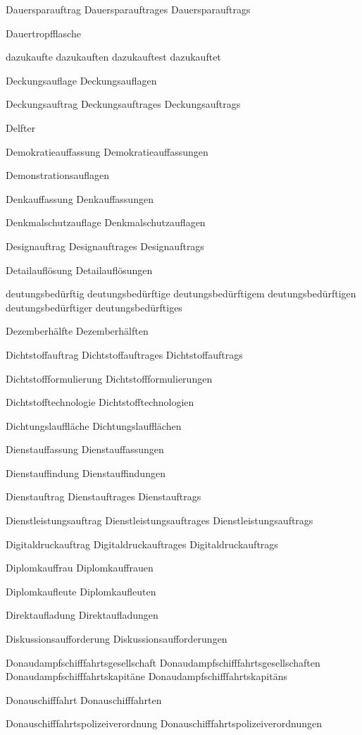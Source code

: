 Dauersparauftrag
Dauersparauftrages
Dauersparauftrags

Dauertropfflasche

dazukaufte
dazukauften
dazukauftest
dazukauftet

Deckungsauflage
Deckungsauflagen

Deckungsauftrag
Deckungsauftrages
Deckungsauftrags

Delfter

Demokratieauffassung
Demokratieauffassungen

Demonstrationsauflagen

Denkauffassung
Denkauffassungen

Denkmalschutzauflage
Denkmalschutzauflagen

Designauftrag
Designauftrages
Designauftrags

Detailauflösung
Detailauflösungen

deutungsbedürftig
deutungsbedürftige
deutungsbedürftigem
deutungsbedürftigen
deutungsbedürftiger
deutungsbedürftiges

Dezemberhälfte
Dezemberhälften

Dichtstoffauftrag
Dichtstoffauftrages
Dichtstoffauftrags

Dichtstoffformulierung
Dichtstoffformulierungen

Dichtstofftechnologie
Dichtstofftechnologien

Dichtungslauffläche
Dichtungslaufflächen

Dienstauffassung
Dienstauffassungen

Dienstauffindung
Dienstauffindungen

Dienstauftrag
Dienstauftrages
Dienstauftrags

Dienstleistungsauftrag
Dienstleistungsauftrages
Dienstleistungsauftrags

Digitaldruckauftrag
Digitaldruckauftrages
Digitaldruckauftrags

Diplomkauffrau
Diplomkauffrauen

Diplomkaufleute
Diplomkaufleuten

Direktaufladung
Direktaufladungen

Diskussionsaufforderung
Diskussionsaufforderungen

Donaudampfschifffahrtsgesellschaft
Donaudampfschifffahrtsgesellschaften
Donaudampfschifffahrtskapitäne
Donaudampfschifffahrtskapitäns

Donauschifffahrt
Donauschifffahrten

Donauschifffahrtspolizeiverordnung
Donauschifffahrtspolizeiverordnungen


